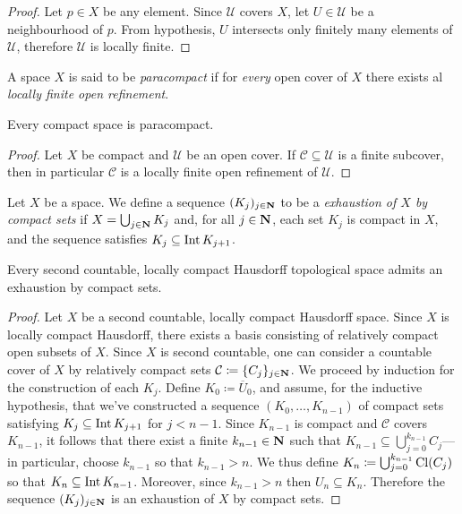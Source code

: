\begin{proof}
Let \(p \in X\) be any element. Since \(\mathcal{U}\) covers \(X\), let
\(U \in \mathcal{U}\) be a neighbourhood of \(p\). From hypothesis, \(U\)
intersects only finitely many elements of \(\mathcal{U}\), therefore
\(\mathcal{U}\) is locally finite.
\end{proof}

\begin{definition}[Paracompactness]
\label{def:paracompact}
A space \(X\) is said to be \emph{paracompact} if for \emph{every} open cover
of \(X\) there exists al \emph{locally finite open refinement}.
\end{definition}

\begin{corollary}
\label{cor:compact-is-paracompact}
Every compact space is paracompact.
\end{corollary}

\begin{proof}
Let \(X\) be compact and \(\mathcal{U}\) be an open cover. If
\(\mathcal{C} \subseteq \mathcal{U}\) is a finite subcover, then in particular
\(\mathcal{C}\) is a locally finite open refinement of \(\mathcal{U}\).
\end{proof}

\begin{definition}
\label{def:compact-exhaustion}
Let \(X\) be a space. We define a sequence \((K_j)_{j \in \mathbf{N}}\) to be a
\emph{exhaustion of \(X\) by compact sets} if \(X = \bigcup_{j \in \mathbf{N}} K_j\)
and, for all \(j \in \mathbf{N}\), each set \(K_j\) is compact in \(X\), and the
sequence satisfies \(K_j \subseteq \operatorname{Int} K_{j + 1}\).
\end{definition}

\begin{lemma}
\label{lem:2nd-loc-cpct-haus-exhaustion}
Every second countable, locally compact Hausdorff topological space admits an
exhaustion by compact sets.
\end{lemma}

\begin{proof}
Let \(X\) be a second countable, locally compact Hausdorff space. Since \(X\) is
locally compact Hausdorff, there exists a basis consisting of relatively compact
open subsets of \(X\). Since \(X\) is second countable, one can consider a
countable cover of \(X\) by relatively compact sets
\(\mathcal{C} \coloneq \{C_j\}_{j \in \mathbf{N}}\). We proceed by induction for the
construction of each \(K_j\). Define \(K_0 \coloneq \overline{U}_0\), and
assume, for the inductive hypothesis, that we've constructed a sequence
\((K_0, \dots, K_{n-1})\) of compact sets satisfying
\(K_j \subseteq \operatorname{Int} K_{j+1}\) for \(j < n-1\). Since \(K_{n-1}\) is compact and
\(\mathcal{C}\) covers \(K_{n-1}\), it follows that there exist a finite
\(k_{n-1} \in \mathbf{N}\) such that
\(K_{n-1} \subseteq \bigcup_{j=0}^{k_{n-1}} C_j\)---in particular, choose
\(k_{n-1}\) so that \(k_{n-1} > n\). We thus define
\(K_n \coloneq \bigcup_{j=0}^{k_{n-1}} \operatorname{Cl}(C_j)\) so that
\(K_n \subseteq \operatorname{Int} K_{n-1}\). Moreover, since \(k_{n-1} > n\) then
\(U_n \subseteq K_n\). Therefore the sequence \((K_j)_{j \in \mathbf{N}}\) is an
exhaustion of \(X\) by compact sets.
\end{proof}


